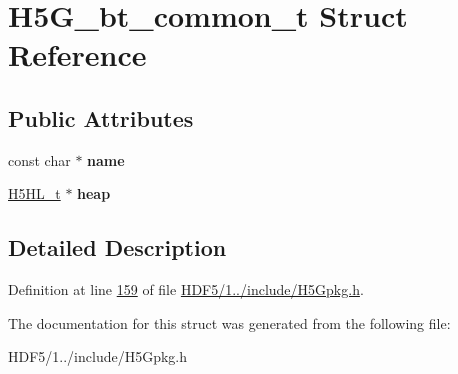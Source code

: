\hypertarget{struct_h5_g__bt__common__t}{}\section{H5\+G\+\_\+bt\+\_\+common\+\_\+t Struct Reference}
\label{struct_h5_g__bt__common__t}
\subsection*{Public Attributes}
\begin{DoxyCompactItemize}
\item 
\mbox{\label{struct_h5_g__bt__common__t_a6549ddde0fc6d498433a5f9ecbab4444}} 
const char $\ast$ {\bfseries name}
\item 
\mbox{\label{struct_h5_g__bt__common__t_a19086c109e3f4021522ae4192a137853}} 
\hyperlink{struct_h5_h_l__t}{H5\+H\+L\+\_\+t} $\ast$ {\bfseries heap}
\end{DoxyCompactItemize}


\subsection{Detailed Description}


Definition at line \hyperlink{_h_d_f5_21_810_81_2include_2_h5_gpkg_8h_source_l00159}{159} of file \hyperlink{_h_d_f5_21_810_81_2include_2_h5_gpkg_8h_source}{H\+D\+F5/1../include/\+H5\+Gpkg.\+h}.



The documentation for this struct was generated from the following file\+:\begin{DoxyCompactItemize}
\item 
H\+D\+F5/1../include/\+H5\+Gpkg.\+h\end{DoxyCompactItemize}
